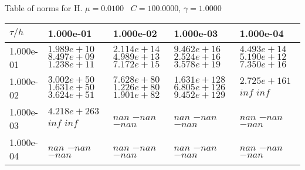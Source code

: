 \begin{center}
Table of norms for H. $\mu = 0.0100$ \, $C = 100.0000$, $\gamma = 1.0000$
  
\begin{tabular}{|p{1in}|p{1in}|p{1in}|p{1in}|p{1in}|} \hline
$\tau / h$ &1.000e-01 &1.000e-02 &1.000e-03 &1.000e-04 \\ \hline 
1.000e-01 & $1.989e+10$  $8.497e+09$  $1.238e+11$  & $2.114e+14$  $4.989e+13$  $7.172e+15$  & $9.462e+16$  $2.524e+16$  $3.578e+19$  & $4.493e+14$  $5.190e+12$  $7.350e+16$  \\ \hline 
1.000e-02 & $3.002e+50$  $1.631e+50$  $3.624e+51$  & $7.628e+80$  $1.226e+80$  $1.901e+82$  & $1.631e+128$  $6.805e+126$  $9.452e+129$  & $2.725e+161$  $inf$  $inf$  \\ \hline 
1.000e-03 & $4.218e+263$  $inf$  $inf$  & $nan$  $-nan$  $-nan$  & $nan$  $-nan$  $-nan$  & $nan$  $-nan$  $-nan$  \\ \hline 
1.000e-04 & $nan$  $-nan$  $-nan$  & $nan$  $-nan$  $-nan$  & $nan$  $-nan$  $-nan$  & $nan$  $-nan$  $-nan$  \\ \hline 

\end{tabular}\\[20pt]
\end{center}
